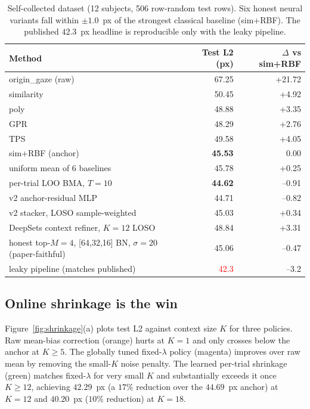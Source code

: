 \begin{table}[t]
\caption{Self-collected dataset (12 subjects, 506 row-random test rows).
Six honest neural variants fall within $\pm 1.0$~px of the strongest
classical baseline (sim+RBF). The published $42.3$~px headline is
reproducible only with the leaky pipeline.}
\label{tab:self_collected}
\centering
\small
\begin{tabular}{lrr}
\toprule
Method & Test L2 (px) & $\Delta$ vs sim+RBF \\
\midrule
origin\_gaze (raw)              & 67.25 & +21.72 \\
similarity                      & 50.45 & +4.92  \\
poly                            & 48.88 & +3.35  \\
GPR                             & 48.29 & +2.76  \\
TPS                             & 49.58 & +4.05  \\
sim+RBF (anchor)                & \textbf{45.53} & 0.00 \\
\midrule
uniform mean of 6 baselines     & 45.78 & +0.25  \\
per-trial LOO BMA, $T{=}10$     & \textbf{44.62} & --0.91 \\
v2 anchor-residual MLP          & 44.71 & --0.82 \\
v2 stacker, LOSO sample-weighted& 45.03 & +0.34 \\
DeepSets context refiner, $K{=}12$ LOSO & 48.84 & +3.31 \\
\midrule
honest top-$M{=}4$, [64,32,16] BN, $\sigma{=}20$ (paper-faithful) & 45.06 & --0.47 \\
\midrule
leaky pipeline (matches published) & \textcolor{red}{42.3} & --3.2 \\
\bottomrule
\end{tabular}
\end{table}

\subsection{Online shrinkage is the win}

Figure~\ref{fig:shrinkage}(a) plots test L2 against context size $K$
for three policies. Raw mean-bias correction (orange) hurts at $K=1$
and only crosses below the anchor at $K \ge 5$. The globally tuned
fixed-$\lambda$ policy (magenta) improves over raw mean by removing the
small-$K$ noise penalty. The learned per-trial shrinkage (green)
matches fixed-$\lambda$ for very small $K$ and substantially exceeds it
once $K \ge 12$, achieving $42.29$~px (a $17\%$ reduction over the
$44.69$~px anchor) at $K=12$ and $40.20$~px ($10\%$ reduction) at
$K=18$.

